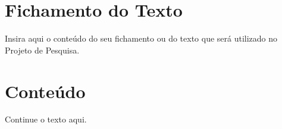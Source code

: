 \documentclass[12pt,a4paper,oneside]{article}
\begin{document}
\thispagestyle{empty}

\section*{Fichamento do Texto}

Insira aqui o conteúdo do seu fichamento ou do texto que será utilizado no Projeto de Pesquisa.

\newpage

\pagestyle{fancy}

\section*{Conteúdo}

Continue o texto aqui.
\end{document}
